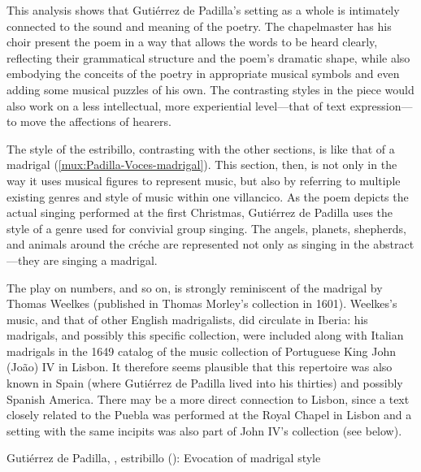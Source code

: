 This analysis shows that Gutiérrez de Padilla's setting as a whole is intimately
connected to the sound and meaning of the poetry.
The chapelmaster has his choir present the poem in a way that allows the words
to be heard clearly, reflecting their grammatical structure and the poem's
dramatic shape, while also embodying the conceits of the poetry in appropriate
musical symbols and even adding some musical puzzles of his own.
The contrasting styles in the piece would also work on a less intellectual, more
experiential level---that of text expression---to move the affections of
hearers.

The style of the estribillo, contrasting with the other sections, is like that
of a madrigal (\cref{mux:Padilla-Voces-madrigal}).
This section, then, is  not only in the way it uses
musical figures to represent music, but also by referring to multiple existing
genres and style of music within one villancico.
As the poem depicts the actual singing performed at the first Christmas,
Gutiérrez de Padilla uses the style of a genre used for convivial group singing.
The angels, planets, shepherds, and animals around the créche are represented
not only as singing in the abstract---they are singing a madrigal.%
\begin{Footnote}
    The play on numbers,  and so on, is strongly
    reminiscent of the madrigal  by Thomas Weelkes (published in Thomas Morley's collection
     in 1601).
    Weelkes's music, and that of other English madrigalists, did circulate in
    Iberia: his madrigals, and possibly this specific collection, were included
    along with Italian madrigals in the 1649 catalog of the music collection of
    Portuguese King John (João) IV in Lisbon.
    It therefore seems plausible that this repertoire was also known in Spain
    (where Gutiérrez de Padilla lived into his thirties) and possibly Spanish
    America.  
    There may be a more direct connection to Lisbon, since a text closely
    related to the Puebla  was performed at the Royal Chapel in
    Lisbon and a setting with the same incipits was also part of John IV's
    collection (see below).
\end{Footnote}

{Gutiérrez de Padilla, , estribillo
(): Evocation of madrigal style}

